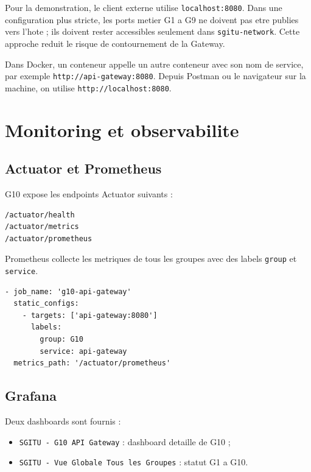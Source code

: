 \documentclass[12pt,a4paper]{article}
\begin{document}
Pour la demonstration, le client externe utilise \texttt{localhost:8080}. Dans une configuration plus stricte, les ports metier G1 a G9 ne doivent pas etre publies vers l'hote ; ils doivent rester accessibles seulement dans \texttt{sgitu-network}. Cette approche reduit le risque de contournement de la Gateway.

\begin{infoBox}
Dans Docker, un conteneur appelle un autre conteneur avec son nom de service, par exemple \texttt{http://api-gateway:8080}. Depuis Postman ou le navigateur sur la machine, on utilise \texttt{http://localhost:8080}.
\end{infoBox}

\newpage

\section{Monitoring et observabilite}

\subsection{Actuator et Prometheus}

G10 expose les endpoints Actuator suivants :

\begin{lstlisting}[style=code]
/actuator/health
/actuator/metrics
/actuator/prometheus
\end{lstlisting}

Prometheus collecte les metriques de tous les groupes avec des labels \texttt{group} et \texttt{service}.

\begin{lstlisting}[style=code]
- job_name: 'g10-api-gateway'
  static_configs:
    - targets: ['api-gateway:8080']
      labels:
        group: G10
        service: api-gateway
  metrics_path: '/actuator/prometheus'
\end{lstlisting}

\subsection{Grafana}

Deux dashboards sont fournis :

\begin{itemize}
  \item \texttt{SGITU - G10 API Gateway} : dashboard detaille de G10 ;
  \item \texttt{SGITU - Vue Globale Tous les Groupes} : statut G1 a G10.
\end{itemize}
\end{document}
